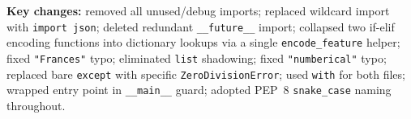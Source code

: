 \documentclass{article}
\begin{document}
\textbf{Key changes:} removed all unused/debug imports; replaced wildcard import with \texttt{import json}; deleted redundant \texttt{\_\_future\_\_} import; collapsed two if-elif encoding functions into dictionary lookups via a single \texttt{encode\_feature} helper; fixed \texttt{"Frances"} typo; eliminated \texttt{list} shadowing; fixed \texttt{"numberical"} typo; replaced bare \texttt{except} with specific \texttt{ZeroDivisionError}; used \texttt{with} for both files; wrapped entry point in \texttt{\_\_main\_\_} guard; adopted PEP~8 \texttt{snake\_case} naming throughout.
\end{document}
